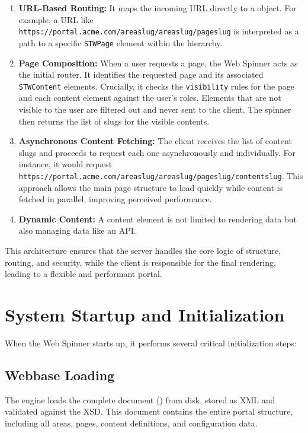 \begin{enumerate}
	\item \textbf{URL-Based Routing:} It maps the incoming URL directly to a \webbase{} object. For example, a URL like \texttt{https://portal.acme.com/areaslug/areaslug/pageslug} is interpreted as a path to a specific \texttt{STWPage} element within the \webbase{} hierarchy.

	\item \textbf{Page Composition:} When a user requests a page, the Web Spinner acts as the initial router. It identifies the requested page and its associated \texttt{STWContent} elements. Crucially, it checks the \texttt{visibility} rules for the page and each content element against the user's roles. Elements that are not visible to the user are filtered out and never sent to the client. The spinner then returns the list of slugs for the visible contents.

	\item \textbf{Asynchronous Content Fetching:} The client receives the list of content slugs and proceeds to request each one asynchronously and individually. For instance, it would request \texttt{https://portal.acme.com/areaslug/areaslug/pageslug/contentslug}. This approach allows the main page structure to load quickly while content is fetched in parallel, improving perceived performance.

	\item \textbf{Dynamic Content:} A content element is not limited to rendering data but also managing data like an API.
\end{enumerate}

This architecture ensures that the server handles the core logic of structure, routing, and security, while the client is responsible for the final rendering, leading to a flexible and performant portal.

\section{System Startup and Initialization}
\label{sec:system-startup}

When the Web Spinner starts up, it performs several critical initialization steps:

\subsection{Webbase Loading}

The engine loads the complete \wbol{} document (\webbase{}) from disk, stored as XML and validated against the \wbol{} XSD. This document contains the entire portal structure, including all areas, pages, content definitions, and configuration data.

